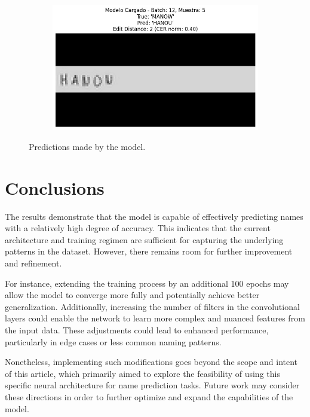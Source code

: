 \documentclass[11pt,letterpaper]{article}
\begin{document}
\begin{figure}[!h]
\begin{subfigure}[b]{0.45\linewidth}
		\end{subfigure}	
		\begin{subfigure}[b]{0.45\linewidth}
			\centering
			\includegraphics[width=\linewidth]{pred4.jpg}
		\end{subfigure}	
		\caption{Predictions made by the model.}
		\label{fig:model_pred}
	\end{figure}
	
	\newpage
	
	\section{Conclusions}
	
	The results demonstrate that the model is capable of effectively predicting names with a relatively high degree of accuracy. This indicates that the current architecture and training regimen are sufficient for capturing the underlying patterns in the dataset. However, there remains room for further improvement and refinement.
	
	For instance, extending the training process by an additional 100 epochs may allow the model to converge more fully and potentially achieve better generalization. Additionally, increasing the number of filters in the convolutional layers could enable the network to learn more complex and nuanced features from the input data. These adjustments could lead to enhanced performance, particularly in edge cases or less common naming patterns.
	
	Nonetheless, implementing such modifications goes beyond the scope and intent of this article, which primarily aimed to explore the feasibility of using this specific neural architecture for name prediction tasks. Future work may consider these directions in order to further optimize and expand the capabilities of the model.
	
	\bigskip
	
	
	
	
\end{document}
